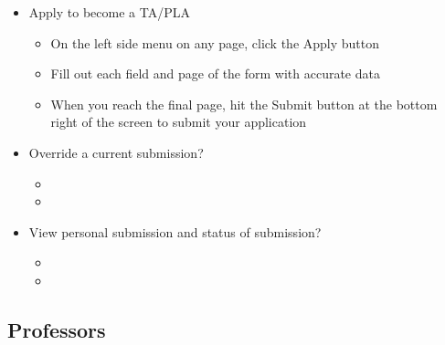\documentclass[11pt]{amsart}
\begin{document}
\begin{itemize}
	\item{Apply to become a TA/PLA}
	\begin{itemize}
		\item{On the left side menu on any page, click the Apply button}
		\item{Fill out each field and page of the form with accurate data}
		\item{When you reach the final page, hit the Submit button at the bottom right of the screen to submit your application}
	\end{itemize}
	\item{Override a current submission?}
	\begin{itemize}
		\item{}
		\item{}
	\end{itemize}
	\item{View personal submission and status of submission?}
	\begin{itemize}
		\item{}
		\item{}
	\end{itemize}
\end{itemize}

\subsection{Professors}
\end{document}
